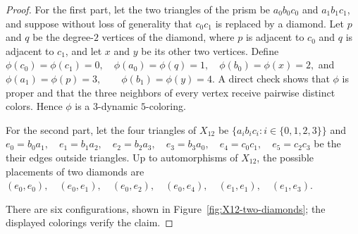 \documentclass[a4paper,11pt]{article}
\theoremstyle{case}
\numberwithin{subcase}{case}
\begin{document}
\begin{proof}
For the first part, 
let the two triangles of the prism be
$a_0b_0c_0$ and $a_1b_1c_1$, and suppose without loss of generality that $c_0c_1$ is replaced
by a diamond. Let $p$ and $q$ be the degree-$2$ vertices of the diamond,
where $p$ is adjacent to $c_0$ and $q$ is adjacent to $c_1$, and let
$x$ and $y$ be its other two vertices. Define
$
\phi(c_0)=\phi(c_1)=0,\quad
\phi(a_0)=\phi(q)=1,\quad
\phi(b_0)=\phi(x)=2,
$
and
$
\phi(a_1)=\phi(p)=3,\qquad
\phi(b_1)=\phi(y)=4.
$
A direct check shows that $\phi$ is proper and that the three neighbors
of every vertex receive pairwise distinct colors. Hence $\phi$ is a
$3$-dynamic $5$-coloring.

For the second part, let
the four triangles of $X_{12}$ be 
$\{a_ib_ic_i: i\in \{0,1,2,3\}\}$ and
$
e_0=b_0a_1,\quad e_1=b_1a_2,\quad
e_2=b_2a_3,\quad e_3=b_3a_0,\quad
e_4=c_0c_1,\quad e_5=c_2c_3
$
be the their edges outside triangles. Up to automorphisms of $X_{12}$, the
possible placements of two diamonds are
$
(e_0,e_0),\quad (e_0,e_1),\quad (e_0,e_2),\quad
(e_0,e_4),\quad (e_1,e_1),\quad (e_1,e_3).
$

There are six configurations, shown in
Figure~\ref{fig:X12-two-diamonds}; the displayed colorings verify the claim.
\end{proof}



\def\Xcfdiamond#1#2#3#4#5{%
  \node[Xcf vertex,
    label={[Xcf label]#4:{$#5$}}]
  (#1) at (#2,#3) {};
}
\end{document}
